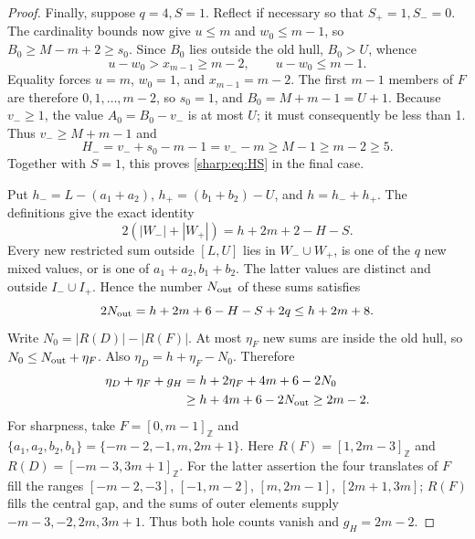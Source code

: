\documentclass[11pt,a4paper]{article}
\newcommand{\Z}{\mathbb Z}
\begin{document}
\begin{proof}
Finally, suppose $q=4,S=1$. Reflect if necessary so that
$S_+=1,S_-=0$. The cardinality bounds now give $u\le m$ and
$w_0\le m-1$, so $B_0\ge M-m+2\ge s_0$. Since $B_0$ lies outside the
old hull, $B_0>U$, whence
\[
 u-w_0>x_{m-1}\ge m-2,\qquad u-w_0\le m-1.
\]
Equality forces $u=m$, $w_0=1$, and $x_{m-1}=m-2$. The first $m-1$
members of $F$ are therefore $0,1,\ldots,m-2$, so $s_0=1$, and
$B_0=M+m-1=U+1$. Because $v_-\ge1$, the value $A_0=B_0-v_-$ is at most
$U$; it must consequently be less than 1. Thus $v_-\ge M+m-1$ and
\[
 H_-=v_-+s_0-m-1=v_--m\ge M-1\ge m-2\ge5.
\]
Together with $S=1$, this proves \eqref{sharp:eq:HS} in the final case.

Put $h_-=L-(a_1+a_2)$, $h_+=(b_1+b_2)-U$, and $h=h_-+h_+$.
The definitions give the exact identity
\[
 2(|W_-|+|W_+|)=h+2m+2-H-S.
\]
Every new restricted sum outside $[L,U]$ lies in $W_-\cup W_+$, is one
of the $q$ new mixed values, or is one of $a_1+a_2,b_1+b_2$. The latter
values are distinct and outside $I_-\cup I_+$. Hence the number $N_{\rm out}$
of these sums satisfies
\[
 2N_{\rm out}=h+2m+6-H-S+2q\le h+2m+8.
\]
Write $N_0=|R(D)|-|R(F)|$. At most $\eta_F$ new sums are inside the old
hull, so $N_0\le N_{\rm out}+\eta_F$. Also
$\eta_D=h+\eta_F-N_0$. Therefore
\begin{align*}
 \eta_D+\eta_F+g_H
 &=h+2\eta_F+4m+6-2N_0\\
 &\ge h+4m+6-2N_{\rm out}\ge2m-2.
\end{align*}
For sharpness, take $F=[0,m-1]_{\Z}$ and
$\{a_1,a_2,b_2,b_1\}=\{-m-2,-1,m,2m+1\}$.
Here $R(F)=[1,2m-3]_{\Z}$ and $R(D)=[-m-3,3m+1]_{\Z}$.
For the latter assertion the four translates of $F$ fill the ranges
$[-m-2,-3]$, $[-1,m-2]$, $[m,2m-1]$, $[2m+1,3m]$;
$R(F)$ fills the central gap, and the sums of outer elements supply
$-m-3,-2,2m,3m+1$. Thus both hole counts vanish and $g_H=2m-2$.
\end{proof}
\end{document}
